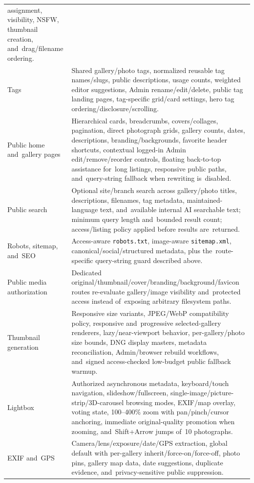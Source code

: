 \documentclass[11pt,a4paper]{article}
\newcommand{\codeword}[1]{\nolinkurl{#1}}
\begin{document}
\begin{longtable}{%
    >{\raggedright\arraybackslash}p{}%
    >{\raggedright\arraybackslash}p{}%
}
assignment, visibility, NSFW, thumbnail creation, and~drag/filename ordering.\\
Tags & Shared gallery/photo tags, normalized reusable tag names/slugs, public
descriptions, usage counts, weighted editor suggestions, Admin
rename/edit/delete, public tag landing pages, tag-specific grid/card settings,
hero tag ordering/disclosure/scrolling.\\
Public home and~gallery pages & Hierarchical cards, breadcrumbs,
covers/collages, pagination, direct photograph grids, gallery counts, dates,
descriptions, branding/backgrounds, favorite header shortcuts, contextual
logged-in Admin edit/remove/reorder controls, floating back-to-top assistance
for~long listings, responsive public paths, and~query-string fallback when
rewriting is~disabled.\\
Public search & Optional site/branch search across gallery/photo titles,
descriptions, filenames, tag metadata, maintained-language text, and~available
internal AI searchable text; minimum query length and~bounded result count;
access/listing policy applied before results are~returned.\\
Robots, sitemap, and~SEO & Access-aware \codeword{robots.txt}, image-aware
\codeword{sitemap.xml}, canonical/social/structured metadata, plus
the~route-specific query-string guard described above.\\
Public media authorization & Dedicated
original/thumbnail/cover/branding/background/favicon routes re-evaluate
gallery/image visibility and~protected access instead of~exposing arbitrary
filesystem paths.\\
Thumbnail generation & Responsive size variants, JPEG/WebP compatibility policy,
responsive and~progressive selected-gallery renderers, lazy/near-viewport
behavior, per-gallery/photo size bounds, DNG display masters, metadata
reconciliation, Admin/browser rebuild workflows, and~signed access-checked
low-budget public fallback warmup.\\
Lightbox & Authorized asynchronous metadata, keyboard/touch navigation,
slideshow/fullscreen, single-image/picture-strip/3D-carousel browsing modes,
EXIF/map overlay, voting state, 100--400\% zoom with pan/pinch/cursor anchoring,
immediate original-quality promotion when zooming, and~Shift+Arrow jumps of~10
photographs.\\
EXIF and~GPS & Camera/lens/exposure/date/GPS extraction, global default with
per-gallery inherit/force-on/force-off, photo pins, gallery map data, date
suggestions, duplicate evidence, and~privacy-sensitive public suppression.\\

\end{longtable}
\end{document}
